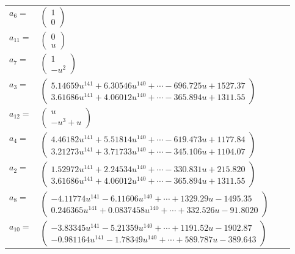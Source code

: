 \documentclass[1p]{elsarticle_modified}
\theoremstyle{definition}
\begin{document}
\begin{tabular}{m{7pt} m{180pt} m{7pt} m{180pt} }
\flushright $a_{6}=$&$\begin{pmatrix}1\\0\end{pmatrix}$ \\
\flushright $a_{11}=$&$\begin{pmatrix}0\\u\end{pmatrix}$ \\
\flushright $a_{7}=$&$\begin{pmatrix}1\\- u^2\end{pmatrix}$ \\
\flushright $a_{3}=$&$\begin{pmatrix}5.14659 u^{141}+6.30546 u^{140}+\cdots-696.725 u+1527.37\\3.61686 u^{141}+4.06012 u^{140}+\cdots-365.894 u+1311.55\end{pmatrix}$ \\
\flushright $a_{12}=$&$\begin{pmatrix}u\\- u^3+u\end{pmatrix}$ \\
\flushright $a_{4}=$&$\begin{pmatrix}4.46182 u^{141}+5.51814 u^{140}+\cdots-619.473 u+1177.84\\3.21273 u^{141}+3.71733 u^{140}+\cdots-345.106 u+1104.07\end{pmatrix}$ \\
\flushright $a_{2}=$&$\begin{pmatrix}1.52972 u^{141}+2.24534 u^{140}+\cdots-330.831 u+215.820\\3.61686 u^{141}+4.06012 u^{140}+\cdots-365.894 u+1311.55\end{pmatrix}$ \\
\flushright $a_{8}=$&$\begin{pmatrix}-4.11774 u^{141}-6.11606 u^{140}+\cdots+1329.29 u-1495.35\\0.246365 u^{141}+0.0837458 u^{140}+\cdots+332.526 u-91.8020\end{pmatrix}$ \\
\flushright $a_{10}=$&$\begin{pmatrix}-3.83345 u^{141}-5.21359 u^{140}+\cdots+1191.52 u-1902.87\\-0.981164 u^{141}-1.78349 u^{140}+\cdots+589.787 u-389.643\end{pmatrix}$ \\

\end{tabular}
\end{document}
